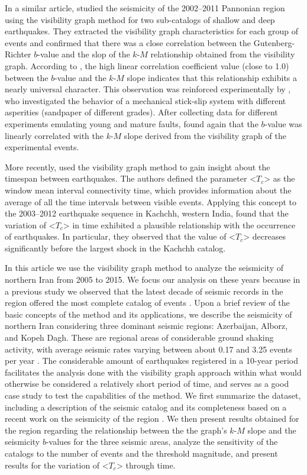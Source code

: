 In a similar article, \citet{Telesca2014} studied the seismicity of the 2002--2011 Pannonian region using the visibility graph method for two sub-catalogs of shallow and deep earthquakes. They extracted the visibility graph characteristics for each group of events and confirmed that there was a close correlation between the Gutenberg-Richter $b$-value and the slop of the $k$-$M$ relationship obtained from the visibility graph. According to \citet{Telesca2014}, the high linear correlation coefficient value (close to 1.0) between the $b$-value and the $k$-$M$ slope indicates that this relationship exhibits a nearly universal character. This observation was reinforced experimentally by \citet{Telesca2014-pone}, who investigated the behavior of a mechanical stick-slip system with different asperities (sandpaper of different grades). After collecting data for different experiments emulating young and mature faults, \citet{Telesca2014-pone} found again that the $b$-value was linearly correlated with the $k$-$M$ slope derived from the visibility graph of the experimental events.

More recently, \citet{Telesca2016} used the visibility graph method to gain insight about the timespan between earthquakes. The authors defined the parameter <$T_c$> as the window mean interval connectivity time, which provides information about the average of all the time intervals between visible events. Applying this concept to the 2003--2012 earthquake sequence in Kachchh, western India, \citet{Telesca2016} found that the variation of <$T_c$> in time exhibited a plausible relationship with the occurrence of earthquakes. In particular, they observed that the value of <$T_c$> decreases significantly before the largest shock in the Kachchh catalog.

In this article we use the visibility graph method to analyze the seismicity of northern Iran from 2005 to 2015. We focus our analysis on these years because in a previous study we observed that the latest decade of seismic records in the region offered the most complete catalog of events \citep[e.g.][]{Khoshnevis2016}. Upon a brief review of the basic concepts of the method and its applications, we describe the seismicity of northern Iran considering three dominant seismic regions: Azerbaijan, Alborz, and Kopeh Dagh. These are regional areas of considerable ground shaking activity, with average seismic rates varying between about 0.17 and 3.25 events per year \citep[e.g.,][]{Nemati2015}. The considerable amount of earthquakes registered in a 10-year period facilitates the analysis done with the visibility graph approach within what would otherwise be considered a relatively short period of time, and serves as a good case study to test the capabilities of the method. We first summarize the dataset, including a description of the seismic catalog and its completeness based on a recent work on the seismicity of the region \citep{Khoshnevis2016}. We then present results obtained for the region regarding the relationship between the the graph's $k$-$M$ slope and the seismicity $b$-values for the three seismic areas, analyze the sensitivity of the catalogs to the number of events and the threshold magnitude, and present results for the variation of <$T_c$> through time.
